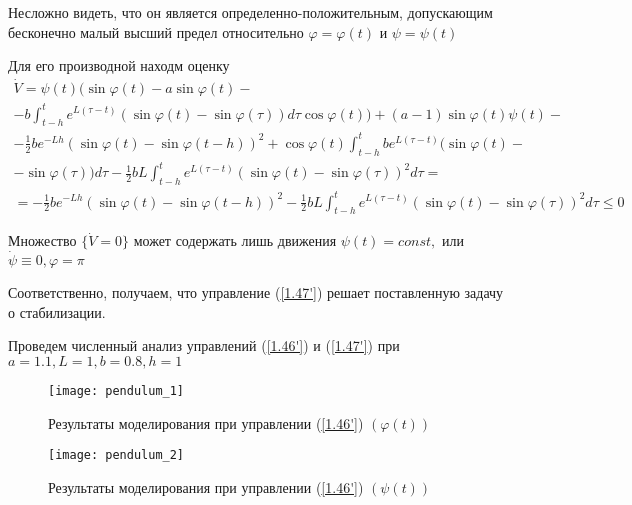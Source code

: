 Несложно видеть, что он является определенно-положительным, допускающим бесконечно малый высший предел относительно $\varphi = \varphi (t)$ и $\psi = \psi (t)$

Для его производной находм оценку
$$
\begin{array}{c}
\displaystyle \dot V = \psi (t) (\sin \varphi (t) - a \sin \varphi (t) -\\
\displaystyle - b \int_{t-h}^{t} e^{L (\tau - t)} (\sin \varphi (t) - \sin \varphi (\tau)) d \tau \cos \varphi (t)) + (a - 1) \sin \varphi (t) \psi (t)-\\
\displaystyle - \frac12 b e^{- L h} (\sin \varphi (t) - \sin \varphi (t - h))^2 + \cos \varphi (t) \int_{t-h}^{t} b e^{L (\tau - t)} (\sin \varphi (t)-\\
\displaystyle - \sin \varphi (\tau)) d \tau - \frac12 b L \int_{t-h}^{t} e^{L (\tau - t)} (\sin \varphi (t) - \sin \varphi (\tau))^2 d \tau =\\
\displaystyle = - \frac12 b e^{- L h} (\sin \varphi (t) - \sin \varphi (t - h))^2 - \frac12 b L \int_{t-h}^{t} e^{L (\tau - t)} (\sin \varphi (t) - \sin \varphi (\tau))^2 d \tau \le 0
\end{array}
$$

Множество $\lbrace \dot V = 0 \rbrace$ может содержать лишь движения $\psi (t) = const,$ или $\dot \psi \equiv 0, \varphi = \pi$

Соответственно, получаем, что управление (\ref{1.47'}) решает поставленную задачу о стабилизации.

Проведем численный анализ управлений (\ref{1.46'}) и (\ref{1.47'}) при $a = 1.1, L = 1, b = 0.8, h = 1$

\begin{figure}[h]
	\centering
	\texttt{[image: pendulum\_1]}
	\caption{Результаты моделирования при управлении (\ref{1.46'}) $(\varphi (t))$}
	\label{fig:pendulum_1}
\end{figure}

\begin{figure}[h]
	\centering
	\texttt{[image: pendulum\_2]}
	\caption{Результаты моделирования при управлении (\ref{1.46'}) $(\psi (t))$}
	\label{fig:pendulum_2}
\end{figure}